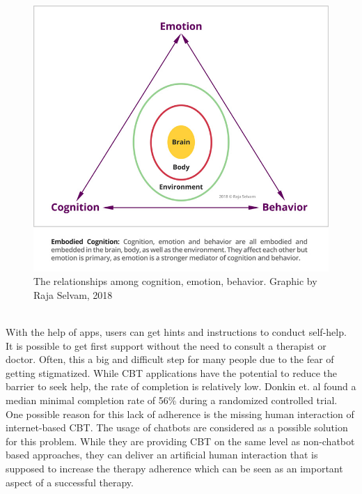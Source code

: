\documentclass[sigconf, nonacm]{acmart}
\begin{document}
\begin{figure}[h]
  \centering
  \includegraphics[width=\linewidth]{cbt_picture}
  \caption[cbt_circle]{The relationships among cognition, emotion, behavior. Graphic by Raja Selvam, 2018\footnotemark}
  \label{fig:cbt_circle}
\end{figure}
\\
With the help of apps, users can get hints and instructions to conduct self-help. It is possible
to get first support without the need to consult a therapist or doctor. Often, this a big and 
difficult step for many people due to the fear of getting stigmatized\cite{Rossler2016}.
While CBT applications have the potential to reduce the barrier to seek help, the rate of completion
is relatively low. Donkin et. al \cite{Donkin} found a median minimal completion rate of 56\% during a randomized controlled trial. 
One possible reason for this lack of adherence is the missing human interaction of internet-based CBT\cite{Ly2017}.
The usage of chatbots are considered as a possible solution for this problem. While they are providing CBT on the same level 
as non-chatbot based approaches, they can deliver an artificial human interaction that is supposed to increase the
therapy adherence which can be seen as an important aspect of a successful therapy. 
\end{document}

